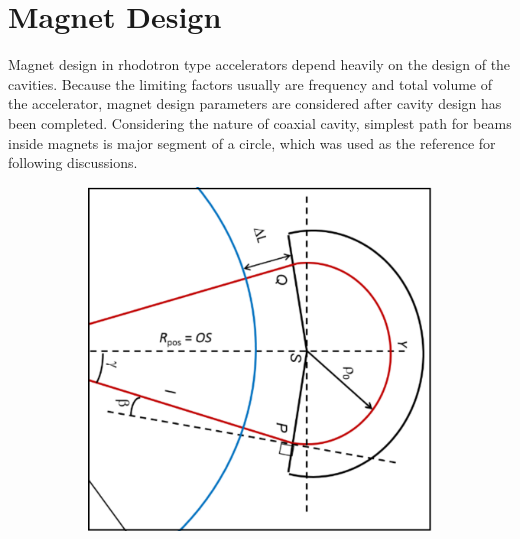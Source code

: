 \documentclass{article}
\begin{document}
\section{Magnet Design} \label{sec:magnet_design}
Magnet design in rhodotron type accelerators depend heavily on the design of the cavities.
Because the limiting factors usually are frequency and total volume of the accelerator, magnet design parameters are considered after cavity design has been completed.
Considering the nature of coaxial cavity, simplest path for beams inside magnets is major segment of a circle, which was used as the reference for following discussions.
\iffalse \begin{figure}[H]
    \centering
    \begin{subfigure}{.5\textwidth}
      \centering
      \includegraphics[width=.9\linewidth]{../../../figures/design/Ltot.png}
    \end{subfigure}%
    \centering
    \begin{subfigure}{.5\textwidth}
      \centering

\end{subfigure}
\end{figure}
\end{document}
